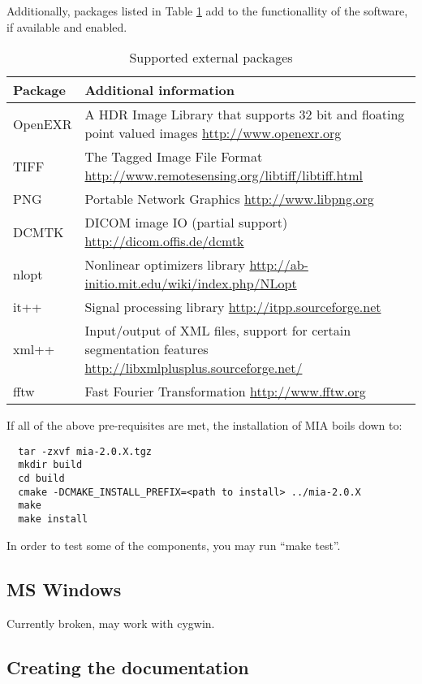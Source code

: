 \documentclass[english, 10pt, a4paper,headsepline,openany]{book}
\begin{document}
\noindent 
Additionally, packages listed in Table \ref{tab:external} add to the functionallity of the software, 
   if available and enabled.

\begin{table}[h]
\caption{\label{tab:external}Supported external packages}
\begin{tabularx}{\linewidth}{lX}
\hline 
{\bf Package } & {\bf Additional information} \\
\hline 
\hline 
{ OpenEXR } & A HDR Image Library that supports 32 bit and floating point valued 
                 images \url{http://www.openexr.org} \\
\hline 
{ TIFF } & The Tagged Image File Format \url{http://www.remotesensing.org/libtiff/libtiff.html} \\
\hline 
{ PNG } & Portable Network Graphics \url{http://www.libpng.org} \\
\hline 
{ DCMTK } & DICOM image IO (partial support) \url{http://dicom.offis.de/dcmtk} \\
\hline 
{ nlopt } & Nonlinear optimizers library  \url{http://ab-initio.mit.edu/wiki/index.php/NLopt} \\
\hline 
{ it++ } & Signal processing library \url{http://itpp.sourceforge.net}  \\
\hline 
{ xml++ } & Input/output of XML files, support for certain segmentation features \url{http://libxmlplusplus.sourceforge.net/} \\
\hline 
{ fftw } & Fast Fourier Transformation \url{http://www.fftw.org}  \\
\hline 
\end{tabularx}
\end{table}

If all of the above pre-requisites are met, the installation of MIA boils down to:

\lstset{language=bash}
\begin{lstlisting}
  tar -zxvf mia-2.0.X.tgz
  mkdir build
  cd build
  cmake -DCMAKE_INSTALL_PREFIX=<path to install> ../mia-2.0.X
  make
  make install
\end{lstlisting}
In order to test some of the components, you may run ``make test''. 

\subsection{MS Windows} 

Currently broken, may work with cygwin. 

\subsection{Creating the documentation} 
\end{document}

